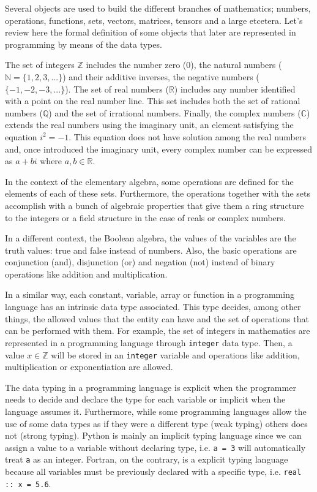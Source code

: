 Several objects are used to build the different branches of mathematics; numbers, operations, functions, sets, vectors, matrices, tensors and a large etcetera. 
Let's review here the formal definition of some objects that later are represented in programming by means of the data types. 

The set of integers $\mathbb{Z}$ includes the number zero (0), the natural numbers ($\mathbb{N} = \{ 1,2,3,... \}$) and their additive inverses, the negative numbers ($\{ -1,-2,-3,... \}$).
The set of real numbers ($\mathbb{R}$) includes any number identified with a point on the real number line.
This set includes both the set of rational numbers ($\mathbb{Q}$) and the set of irrational numbers.
Finally, the complex numbers ($\mathbb{C}$) extends the real numbers using the imaginary unit, an element satisfying the equation $i^2 = -1$.
This equation does not have solution among the real numbers and, 
once introduced the imaginary unit, every complex number can be expressed as $a+bi$ where $a,b\in\mathbb{R}$. 

In the context of the elementary algebra, some operations are defined for the elements of each of these sets.
Furthermore, the operations together with the sets accomplish with a bunch of algebraic properties that give them 
a ring structure to the integers 
or a field structure in the case of reals or complex numbers. 

In a different context, the Boolean algebra, the values of the variables are the truth values: true and false instead of numbers.
Also, the basic operations are conjunction (and), disjunction (or) and negation (not) instead of binary operations like addition and multiplication.

In a similar way, each constant, variable, array or function in a programming language has an intrinsic data type associated. 
This type decides, among other things, the allowed values that the entity can have and the set of operations that can be performed with them.
For example, the set of integers in mathematics are represented in a programming language through \texttt{integer} data type. 
Then, a value $x\in \mathbb{Z}$ will be stored in an \texttt{integer} variable and operations like addition, multiplication or exponentiation are allowed. 

The data typing in a programming language is explicit when the programmer needs to decide and declare the type for each variable or implicit when the language assumes it. 
Furthermore, while some programming languages allow the use of some data types as if they were a different type (weak typing) others does not (strong typing). 
Python is mainly an implicit typing language since we can assign a value to a variable without declaring type, i.e. \texttt{a = 3} will automatically treat \texttt{a} as an integer. 
Fortran, on the contrary, is a explicit typing language because all variables must be previously declared with a specific type, i.e. \texttt{real :: x = 5.6}.



